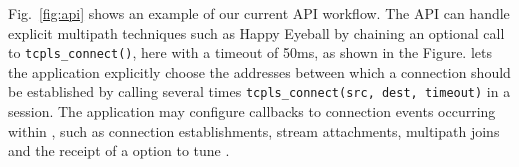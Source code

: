 Fig.~\ref{fig:api} shows an example of our current API workflow. The API can
handle explicit multipath techniques such as Happy Eyeball by chaining an 
optional call to \texttt{tcpls\_connect()}, here with a timeout of 50ms, as 
shown in the Figure. \tcpls lets the application explicitly choose the addresses
between which a \tcp connection should be established by calling several times
\texttt{tcpls\_connect(src, dest, timeout)} in a \tcpls session. The 
application may configure
callbacks to connection events occurring within \tcpls, such as connection
establishments, stream attachments, multipath joins and the receipt of a \tcp
option to tune \tcp.







